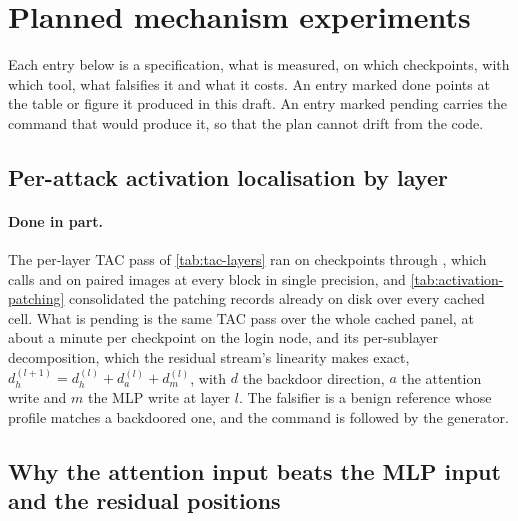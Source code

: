 \documentclass[../main.tex]{subfiles}
\begin{document}
\section{Planned mechanism experiments}
\label{sec:planned}

Each entry below is a specification, what is measured, on which checkpoints, with which tool, what falsifies it and what it costs. An entry marked done points at the table or figure it produced in this draft. An entry marked pending carries the command that would produce it, so that the plan cannot drift from the code.

\subsection{Per-attack activation localisation by layer}

\paragraph{Done in part.} The per-layer TAC pass of \cref{tab:tac-layers} ran on \TacLayersCheckpoints{} checkpoints through , which calls  and  on \TacLayersSamples{} paired images at every block in single precision, and \cref{tab:activation-patching} consolidated the patching records already on disk over every cached cell. What is pending is the same TAC pass over the whole cached panel, at about a minute per checkpoint on the login node, and its per-sublayer decomposition, which the residual stream's linearity makes exact, $d_h^{(l+1)} = d_h^{(l)} + d_a^{(l)} + d_m^{(l)}$, with $d$ the backdoor direction, $a$ the attention write and $m$ the MLP write at layer $l$. The falsifier is a benign reference whose profile matches a backdoored one, and the command is  followed by the generator.

\subsection{Why the attention input beats the MLP input and the residual positions}
\end{document}
